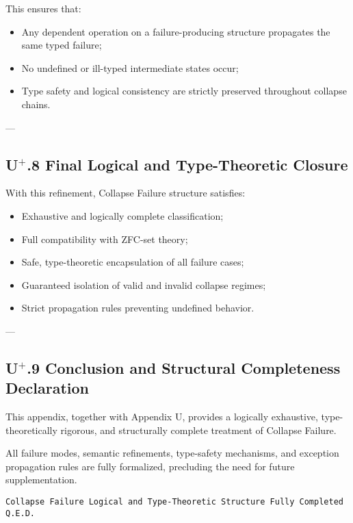 \documentclass[11pt]{article}
\begin{document}
This ensures that:

\begin{itemize}
    \item Any dependent operation on a failure-producing structure propagates the same typed failure;
    \item No undefined or ill-typed intermediate states occur;
    \item Type safety and logical consistency are strictly preserved throughout collapse chains.
\end{itemize}

---

\subsection*{U$^{+}$.8 Final Logical and Type-Theoretic Closure}

With this refinement, Collapse Failure structure satisfies:

\begin{itemize}
    \item Exhaustive and logically complete classification;
    \item Full compatibility with ZFC-set theory;
    \item Safe, type-theoretic encapsulation of all failure cases;
    \item Guaranteed isolation of valid and invalid collapse regimes;
    \item Strict propagation rules preventing undefined behavior.
\end{itemize}

---

\subsection*{U$^{+}$.9 Conclusion and Structural Completeness Declaration}

This appendix, together with Appendix U, provides a logically exhaustive, type-theoretically rigorous, and structurally complete treatment of Collapse Failure.

All failure modes, semantic refinements, type-safety mechanisms, and exception propagation rules are fully formalized, precluding the need for future supplementation.

\begin{flushright}
\texttt{Collapse Failure Logical and Type-Theoretic Structure \quad Fully Completed \quad Q.E.D.}
\end{flushright}
\end{document}
